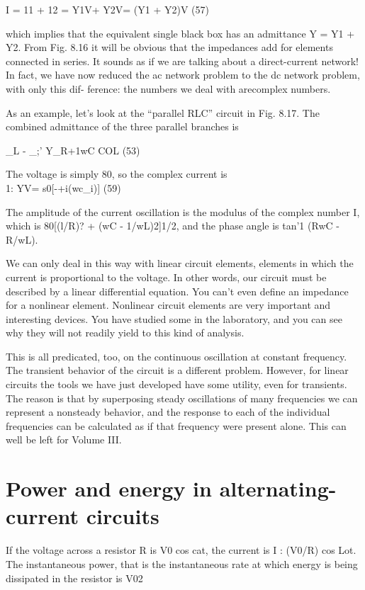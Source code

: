 \begin{equation}
\end{equation}
I = 11 + 12 = Y1V+ Y2V= (Y1 + Y2)V (57)

  

which implies that the equivalent single black box has an admittance
Y = Y1 + Y2. From Fig. 8.16 it will be obvious that the impedances
add for elements connected in series. It sounds as if we are talking
about a direct-current network! In fact, we have now reduced the
ac network problem to the dc network problem, with only this dif-
ference: the numbers we deal with arecomplex numbers.

As an example, let's look at the ``parallel RLC'' circuit in
Fig. 8.17. The combined admittance of the three parallel branches is

\begin{equation}
\end{equation}
_L - _;'
Y_R+1wC COL (53)

The voltage is simply 80, so the complex current is
\begin{equation}
\end{equation}
1: YV= s0[-+i(wc_i)] (59)

The amplitude of the current oscillation is the modulus of the complex
number I, which is 80[(l/R)? + (wC - 1/wL)2]1/2, and the
phase angle is tan'1 (RwC - R/wL).

We can only deal in this way with linear circuit elements, elements
in which the current is proportional to the voltage. In other words,
our circuit must be described by a linear differential equation. You
can't even define an impedance for a nonlinear element. Nonlinear
circuit elements are very important and interesting devices. You
have studied some in the laboratory, and you can see why they will
not readily yield to this kind of analysis.

This is all predicated, too, on the continuous oscillation at constant
frequency. The transient behavior of the circuit is a different
problem. However, for linear circuits the tools we have just developed
have some utility, even for transients. The reason is that by
superposing steady oscillations of many frequencies we can represent
a nonsteady behavior, and the response to each of the individual
frequencies can be calculated as if that frequency were present alone.
This can well be left for Volume III.

\section{Power and energy in alternating-current circuits}
If the voltage across a resistor R is V0 cos cat, the current is
I : (V0/R) cos Lot. The instantaneous power, that is the instantaneous
rate at which energy is being dissipated in the resistor is
V02

